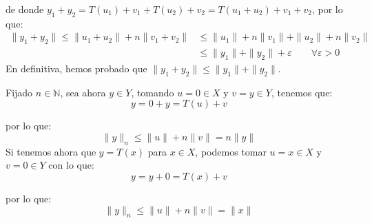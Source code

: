 \begin{ejercicio}
\begin{itemize}
\begin{equation*}
            \end{equation*}
            de donde $y_1+y_2 = T(u_1)+v_1 + T(u_2)+v_2 = T(u_1+u_2)+v_1+v_2$, por lo que:
            \begin{align*}
                \|y_1 + y_2\| \leq \|u_1+u_2\| + n\|v_1+v_2\| &\leq \|u_1\|+n\|v_1\| + \|u_2\|+n\|v_2\| \\ &\leq \|y_1\|+\|y_2\| + \varepsilon \qquad \forall \varepsilon>0
            \end{align*}
            En definitiva, hemos probado que $\|y_1+y_2\| \leq \|y_1\| + \|y_2\|$.
    \end{itemize}
    Fijado $n\in \mathbb{N}$, sea ahora $y\in Y$, tomando $u=0\in X$ y $v=y\in Y$, tenemos que:
    \begin{equation*}
        y = 0 + y = T(u) + v
    \end{equation*}

    por lo que:
    \begin{equation*}
        \|y\|_n \leq \|u\|+n\|v\| = n\|y\|
    \end{equation*}
    Si tenemos ahora que $y=T(x)$ para $x\in X$, podemos tomar $u=x\in X$ y $v=0\in Y$ con lo que:
    \begin{equation*}
        y = y + 0 = T(x) + v
    \end{equation*}

    por lo que:
    \begin{equation*}
        \|y\|_n \leq \|u\| + n\|v\| = \|x\|
    \end{equation*}
\end{ejercicio}

